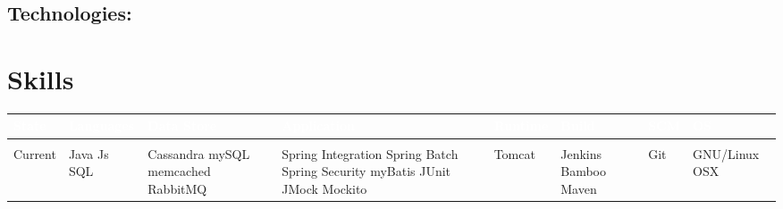 \documentclass[a4paper]{article}
\begin{document}


\subsection*{Technologies:} 


\section*{\LARGE{Skills\newline}} 

\begin{tabular}{| >{\centering\arraybackslash}m{1.2cm} |  >{\centering\arraybackslash}m{1.8cm} |  >{\centering\arraybackslash}m{2cm}  |  >{\centering\arraybackslash}m{2.8cm}  |  >{\centering\arraybackslash}m{1.4cm}  |  >{\centering\arraybackslash}m{1.2cm}  |  >{\centering\arraybackslash}m{0.8cm} |  >{\centering\arraybackslash}m{1.6cm}  |} \hline 
	\cellcolor{black}\textcolor{white}{State} & \cellcolor{black}\textcolor{white}{Languages} & \cellcolor{black}\textcolor{white}{Data Store} & \cellcolor{black}\textcolor{white}{Application} & \cellcolor{black}\textcolor{white}{Runtime} & \cellcolor{black}\textcolor{white}{Build} & \cellcolor{black}\textcolor{white}{SCM} & \cellcolor{black}\textcolor{white}{OS} \\ \hline  
	      & 	  & 	       &             &         &       &     &    \\
	Current & Java \newline Js \newline SQL \newline & Cassandra \newline mySQL \newline memcached \newline RabbitMQ & Spring Integration \newline Spring Batch \newline Spring Security \newline myBatis \newline JUnit \newline JMock \newline Mockito \newline & Tomcat & Jenkins \newline Bamboo \newline Maven & Git & GNU/Linux \newline OSX \\ \hline

\end{tabular}
\end{document}
